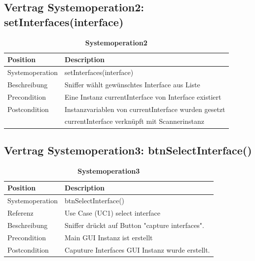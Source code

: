 \documentclass[a4,12pt]{scrartcl}
\begin{document}
\subsection{Vertrag Systemoperation2: setInterfaces(interface)}
\begin{table}[H]
\centering
    \begin{tabular}{@{} l l@{}}    
    {Position} & {Description}\\ \midrule
   	Systemoperation & setInterfaces(interface)\\ \addlinespace
   	Beschreibung & Sniffer wählt gewünschtes Interface aus Liste\\ \addlinespace
   	Precondition & Eine Instanz currentInterface von Interface existiert\\ \addlinespace
	Postcondition & Instanzvariablen von currentInterface wurden gesetzt\\
	\addlinespace
	& currentInterface verknüpft mit Scannerinstanz\\ \bottomrule
    \end{tabular}
\caption{\textbf{Systemoperation2}}
\end{table}

\subsection{Vertrag Systemoperation3: btnSelectInterface()}
\begin{table}[H]
\centering
    \begin{tabular}{@{} l l@{}}    
    {Position} & {Description}\\ \midrule
   	Systemoperation & btnSelectInterface() \\ \addlinespace
   	Referenz & Use Case (UC1) select interface\\ \addlinespace
   	Beschreibung & Sniffer drückt auf Button "capture interfaces". \\ \addlinespace
   	Precondition & Main GUI Instanz ist erstellt\\ \addlinespace
	Postcondition & Caputure Interfaces GUI Instanz wurde erstellt.\\ \bottomrule
    \end{tabular}
\caption{\textbf{Systemoperation3}}
\end{table}
\end{document}
